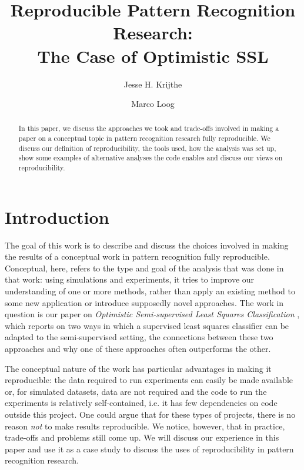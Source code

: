 \documentclass[runningheads,a4paper]{llncs}\usepackage[]{graphicx}\usepackage[]{color}
\begin{document}
\title{Reproducible Pattern Recognition Research:\\The Case of Optimistic SSL}

\author{Jesse H. Krijthe \and Marco Loog}


			
\maketitle

\begin{abstract}
In this paper, we discuss the approaches we took and trade-offs involved in making a paper on a conceptual topic in pattern recognition research fully reproducible. We discuss our definition of reproducibility, the tools used, how the analysis was set up, show some examples of alternative analyses the code enables and discuss our views on reproducibility.
\end{abstract}


\section{Introduction}
The goal of this work is to describe and discuss the choices involved in making the results of a conceptual work in pattern recognition fully reproducible. Conceptual, here, refers to the type and goal of the analysis that was done in that work: using simulations and experiments, it tries to improve our understanding of one or more methods, rather than apply an existing method to some new application or introduce supposedly novel approaches. The work in question is our paper on \textit{Optimistic Semi-supervised Least Squares Classification} \cite{Krijthe2016a}, which reports on two ways in which a supervised least squares classifier can be adapted to the semi-supervised setting, the connections between these two approaches and why one of these approaches often outperforms the other.

The conceptual nature of the work has particular advantages in making it reproducible: the data required to run experiments can easily be made available or, for simulated datasets, data are not required and the code to run the experiments is relatively self-contained, i.e. it has few dependencies on code outside this project. One could argue that for these types of projects, there is no reason \emph{not} to make results reproducible. We notice, however, that in practice, trade-offs and problems still come up. We will discuss our experience in this paper and use it as a case study to discuss the uses of reproducibility in pattern recognition research.
\end{document}
